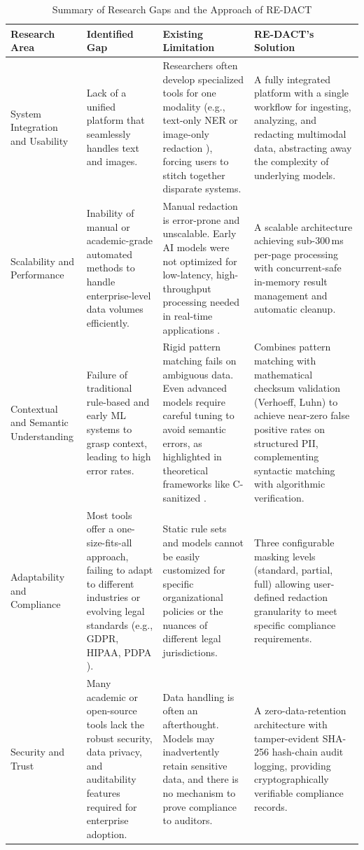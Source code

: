 \documentclass[conference]{IEEEtran}
\begin{document}
\begin{table}[htbp]
\caption{Summary of Research Gaps and the Approach of RE-DACT}
\label{tab:research_gaps}
\centering
\renewcommand{\arraystretch}{1.3}
\begin{tabular}{|p{3cm}|p{4cm}|p{4.5cm}|p{4.5cm}|}
\hline
\textbf{Research Area} & \textbf{Identified Gap} & \textbf{Existing Limitation} & \textbf{RE-DACT's Solution} \\
\hline
System Integration and Usability & Lack of a unified platform that seamlessly handles text and images. & Researchers often develop specialized tools for one modality (e.g., text-only NER \cite{b1} or image-only redaction \cite{b13}), forcing users to stitch together disparate systems. & A fully integrated platform with a single workflow for ingesting, analyzing, and redacting multimodal data, abstracting away the complexity of underlying models. \\
\hline
Scalability and Performance & Inability of manual or academic-grade automated methods to handle enterprise-level data volumes efficiently. & Manual redaction is error-prone and unscalable. Early AI models were not optimized for low-latency, high-throughput processing needed in real-time applications \cite{b2}. & A scalable architecture achieving sub-300\,ms per-page processing with concurrent-safe in-memory result management and automatic cleanup. \\
\hline
Contextual and Semantic Understanding & Failure of traditional rule-based and early ML systems to grasp context, leading to high error rates. & Rigid pattern matching fails on ambiguous data. Even advanced models require careful tuning to avoid semantic errors, as highlighted in theoretical frameworks like C-sanitized \cite{b11}. & Combines pattern matching with mathematical checksum validation (Verhoeff, Luhn) to achieve near-zero false positive rates on structured PII, complementing syntactic matching with algorithmic verification. \\
\hline
Adaptability and Compliance & Most tools offer a one-size-fits-all approach, failing to adapt to different industries or evolving legal standards (e.g., GDPR, HIPAA, PDPA \cite{b16}). & Static rule sets and models cannot be easily customized for specific organizational policies or the nuances of different legal jurisdictions. & Three configurable masking levels (standard, partial, full) allowing user-defined redaction granularity to meet specific compliance requirements. \\
\hline
Security and Trust & Many academic or open-source tools lack the robust security, data privacy, and auditability features required for enterprise adoption. & Data handling is often an afterthought. Models may inadvertently retain sensitive data, and there is no mechanism to prove compliance to auditors. & A zero-data-retention architecture with tamper-evident SHA-256 hash-chain audit logging, providing cryptographically verifiable compliance records. \\
\hline
\end{tabular}
\end{table}
\end{document}

